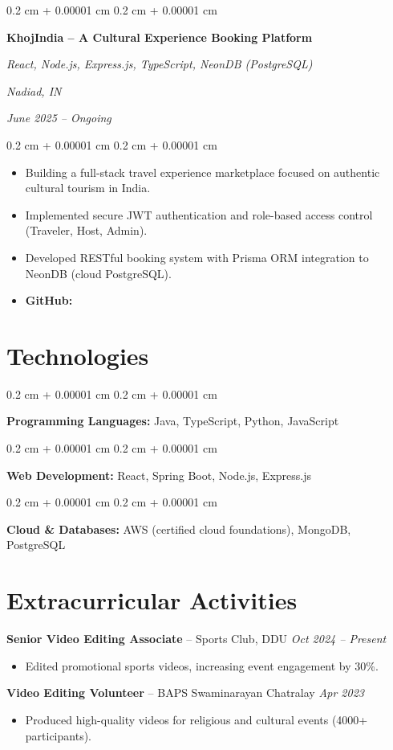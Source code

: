 \documentclass[10pt, letterpaper]{article}
\newenvironment{highlights}{
    \begin{itemize}[
        topsep=0.05 cm,
        parsep=0.05 cm,
        partopsep=0pt,
        itemsep=0pt,
        leftmargin=0.4 cm + 10pt
    ]
}{
    \end{itemize}
} %
\newenvironment{onecolentry}{
    \begin{adjustwidth}{
        0.2 cm + 0.00001 cm
    }{
        0.2 cm + 0.00001 cm
    }
}{
    \end{adjustwidth}
} %
\newenvironment{twocolentry}[2][]{
    \onecolentry
    \def\secondColumn{#2}
    \setcolumnwidth{\fill, 4.5 cm}
    \begin{paracol}{2}
}{
    \switchcolumn \raggedleft \secondColumn
    \end{paracol}
    \endonecolentry
} %
\let\hrefWithoutArrow\href
\renewcommand{\href}[2]{\hrefWithoutArrow{#1}{\ifthenelse{\equal{#2}{}}{ }{#2 }\raisebox{.15ex}{\footnotesize \faExternalLink*}}}
\begin{document}
   \begin{twocolentry}{
    \textit{Nadiad, IN}    
        
    \textit{June 2025 – Ongoing}}
    \textbf{KhojIndia – A Cultural Experience Booking Platform}
    
    \textit{React, Node.js, Express.js, TypeScript, NeonDB (PostgreSQL)}
\end{twocolentry}
\vspace{0.10 cm}
\begin{onecolentry}
    \begin{highlights}
        \item Building a full-stack travel experience marketplace focused on authentic cultural tourism in India.
        \item Implemented secure JWT authentication and role-based access control (Traveler, Host, Admin).
        \item Developed RESTful booking system with Prisma ORM integration to NeonDB (cloud PostgreSQL).
        \item \textbf{GitHub:} \href{https://github.com/harshmanek/KhojIndia}{KhojIndia}
    \end{highlights}
\end{onecolentry}

    \vspace{0.1 cm}
    \section{Technologies}

        \begin{onecolentry}
            \textbf{Programming Languages:} Java, TypeScript, Python, JavaScript 
        \end{onecolentry}

        \vspace{0.1 cm}

        \begin{onecolentry}
            \textbf{Web Development:} React, Spring Boot, Node.js, Express.js
        \end{onecolentry}
        \vspace{0.1 cm}
        \begin{onecolentry}
            \textbf{Cloud \& Databases:} AWS (certified cloud foundations), MongoDB, PostgreSQL
        \end{onecolentry}
        \vspace{0.1 cm}
    
    \section*{Extracurricular Activities}
\textbf{Senior Video Editing Associate} – Sports Club, DDU \hfill \textit{Oct 2024 – Present}  
\begin{itemize}
    \item Edited promotional sports videos, increasing event engagement by 30\%.
\end{itemize}

\textbf{Video Editing Volunteer} – BAPS Swaminarayan Chatralay \hfill \textit{Apr 2023}  
\begin{itemize}
    \item Produced high-quality videos for religious and cultural events (4000+ participants).
\end{itemize}
\end{document}
